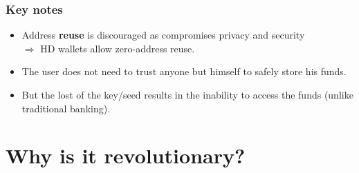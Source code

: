 \documentclass[notitlepage, usenames,dvipsnames]{beamer}
\begin{document}
    

    \begin{frame}
        \frametitle{Key notes}

        
        \begin{itemize}\itemsep=2.5ex
            \item Address \textbf{reuse} is \alert{discouraged} as compromises \alert{privacy} and security\\ $\Rightarrow$ HD wallets allow zero-address reuse.
            \item The user does not need to \alert{trust anyone} but himself to safely store his funds.
            \item But the \alert{lost} of the key/seed results in the \alert{inability} to access the funds (unlike traditional banking).
        \end{itemize}

        
    \end{frame}
    

    \section{Why is it revolutionary?}
\end{document}
